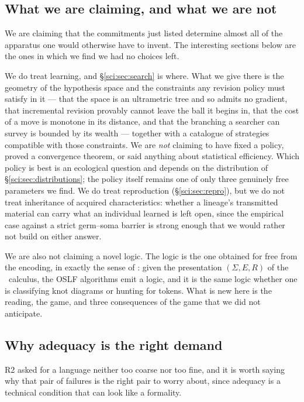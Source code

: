 \subsection{What we are claiming, and what we are not}\label{sci:S1.4}

We are claiming that the commitments just listed determine almost all of the apparatus one would
otherwise have to invent. The interesting sections below are the ones in which we find we had no
choices left.

We do treat learning, and \S\ref{sci:sec:search} is where. What we give there is the geometry of the
hypothesis space and the constraints any revision policy must satisfy in it --- that the space is an
ultrametric tree and so admits no gradient, that incremental revision provably cannot leave the ball it
begins in, that the cost of a move is monotone in its distance, and that the branching a searcher can
survey is bounded by its wealth --- together with a catalogue of strategies compatible with those
constraints. We are \emph{not} claiming to have fixed a policy, proved a convergence theorem, or said
anything about statistical efficiency. Which policy is best is an ecological question and depends on
the distribution of \S\ref{sci:sec:distributions}; the policy itself remains one of only three genuinely
free parameters we find. We do treat reproduction (\S\ref{sci:sec:repro}), but we do not treat inheritance of
acquired characteristics: whether a lineage's transmitted material can carry what an individual
learned is left open, since the empirical case against a strict germ--soma barrier
\cite{Noble} is strong enough that we would rather not build on either answer.

We are also not claiming a novel logic. The logic is the one obtained for free from the encoding, in
exactly the sense of \cite{ClassifierNote}: given the presentation $(\Sigma, E, R)$ of the \rhoc\
calculus, the OSLF algorithms emit a logic, and it is the same logic whether one is classifying knot
diagrams or hunting for tokens. What is new here is the reading, the game, and three consequences of
the game that we did not anticipate.

\subsection{Why adequacy is the right demand}\label{sci:S1.5}

R2 asked for a language neither too coarse nor too fine, and it is worth saying why that pair of
failures is the right pair to worry about, since adequacy is a technical condition that can look like
a formality.

